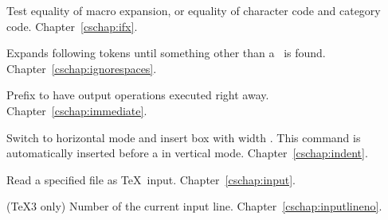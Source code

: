 \begin{glossinventory}
\item [\cs{ifx\gr{token$_1$}\gr{token$_2$}}]
      Test equality of macro expansion, or equality of character code and
      category code.
Chapter~\ref{cschap:ifx}.

\item [\cs{ignorespaces}]  
      Expands following tokens until something other
      than a~ is found.
Chapter~\ref{cschap:ignorespaces}.

\item [\cs{immediate}] 
      Prefix to have output operations executed right away.
Chapter~\ref{cschap:immediate}.

\item [\cs{indent}]
      Switch to horizontal mode and insert box with width .
      This command is automatically inserted before a
       in vertical mode.
Chapter~\ref{cschap:indent}.

\item [\cs{input\gr{file name}}]
      Read a specified file as \TeX\ input. 
Chapter~\ref{cschap:input}.

\item [\cs{inputlineno}]
      (\TeX3 only) 
      Number of the current input line.
Chapter~\ref{cschap:inputlineno}.


\end{glossinventory}
